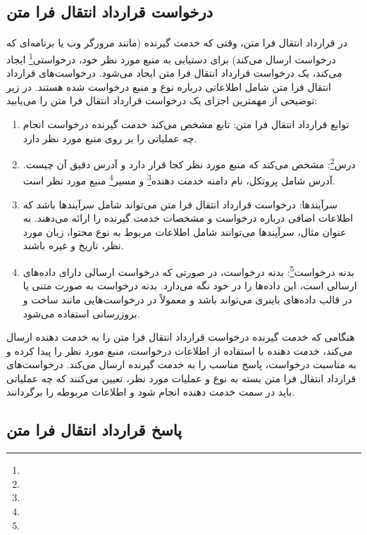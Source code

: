 \subsection{درخواست قرارداد انتقال فرا متن}
\label{subsec:http_requests}
\paragraph{}
{
    در قرارداد انتقال فرا متن، وقتی که خدمت گیرنده (مانند مرورگر وب یا برنامه‌ای که درخواست ارسال می‌کند) برای دستیابی به منبع مورد نظر خود، درخواستی\footnote{} ایجاد می‌کند، یک درخواست قرارداد انتقال فرا متن ایجاد می‌شود. درخواست‌های قرارداد انتقال فرا متن شامل اطلاعاتی درباره نوع و منبع درخواست شده هستند. در زیر توضیحی از مهمترین اجزای یک درخواست قرارداد انتقال فرا متن را می‌یابید:
    \begin{enumerate}
        \item توابع قرارداد انتقال فرا متن: تابع مشخص می‌کند خدمت گیرنده درخواست انجام چه عملیاتی را بر روی منبع مورد نظر دارد.
        \item درس\footnote{}: مشخص می‌کند که منبع مورد نظر کجا قرار دارد و آدرس دقیق آن چیست. آدرس شامل پروتکل، نام دامنه خدمت دهنده‌\footnote{} و مسیر\footnote{} منبع مورد نظر است.
        \item سرآیندها: درخواست قرارداد انتقال فرا متن می‌تواند شامل سرآیندها باشد که اطلاعات اضافی درباره درخواست و مشخصات خدمت گیرنده را ارائه می‌دهند. به عنوان مثال، سرآیندها می‌توانند شامل اطلاعات مربوط به نوع محتوا، زبان مورد نظر، تاریخ و غیره باشند.
        \item بدنه درخواست\footnote{}: بدنه درخواست، در صورتی که درخواست ارسالی دارای داده‌های ارسالی است، این داده‌ها را در خود نگه می‌دارد. بدنه درخواست به صورت متنی یا در قالب داده‌های باینری می‌تواند باشد و معمولاً در درخواست‌هایی مانند ساخت و بروزرسانی استفاده می‌شود.
    \end{enumerate}
    هنگامی که خدمت گیرنده درخواست قرارداد انتقال فرا متن را به خدمت دهنده‌ ارسال می‌کند، خدمت دهنده‌ با استفاده از اطلاعات درخواست، منبع مورد نظر را پیدا کرده و به مناسبت درخواست، پاسخ مناسب را به خدمت گیرنده ارسال می‌کند. درخواست‌های قرارداد انتقال فرا متن بسته به نوع و عملیات مورد نظر، تعیین می‌کنند که چه عملیاتی باید در سمت خدمت دهنده‌ انجام شود و اطلاعات مربوطه را برگردانند.
}

\subsection{پاسخ‌ قرارداد انتقال فرا متن}
\label{subsec:http_responses}

